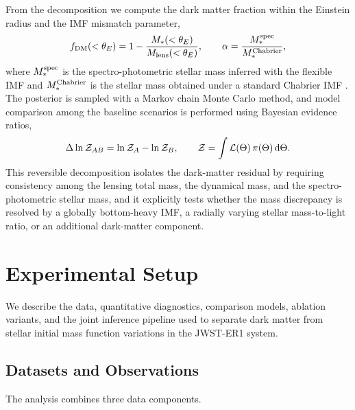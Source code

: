 \documentclass{article}
\begin{document}
From the decomposition we compute the dark matter fraction within the Einstein radius and the IMF mismatch parameter,
\begin{equation}
f_{\rm DM}(<\theta_E) = 1 - \frac{M_*(<\theta_E)}{M_{\rm lens}(<\theta_E)},
\qquad
\alpha = \frac{M_*^{\rm spec}}{M_*^{\rm Chabrier}},
\label{eq:metrics}
\end{equation}
where \(M_*^{\rm spec}\) is the spectro-photometric stellar mass inferred with the flexible IMF and \(M_*^{\rm Chabrier}\) is the stellar mass obtained under a standard Chabrier IMF \cite{Chabrier2003}. The posterior is sampled with a Markov chain Monte Carlo method, and model comparison among the baseline scenarios is performed using Bayesian evidence ratios,
\begin{equation}
\Delta \ln \mathcal{Z}_{AB} = \ln \mathcal{Z}_A - \ln \mathcal{Z}_B,
\qquad
\mathcal{Z} = \int \mathcal{L}(\Theta)\, \pi(\Theta)\, {\rm d}\Theta.
\label{eq:evidence}
\end{equation}
This reversible decomposition isolates the dark-matter residual by requiring consistency among the lensing total mass, the dynamical mass, and the spectro-photometric stellar mass, and it explicitly tests whether the mass discrepancy is resolved by a globally bottom-heavy IMF, a radially varying stellar mass-to-light ratio, or an additional dark-matter component.

\section{Experimental Setup}
\label{sec:experimental_setup}

We describe the data, quantitative diagnostics, comparison models, ablation variants, and the joint inference pipeline used to separate dark matter from stellar initial mass function variations in the JWST-ER1 system.

\subsection{Datasets and Observations}
The analysis combines three data components.
\end{document}
